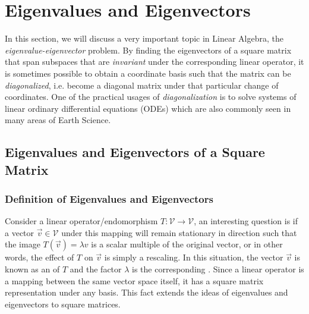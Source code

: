 \chapter{Eigenvalues and Eigenvectors}
\label{chap:eigen}

In this section, we will discuss a very important topic in Linear Algebra, the \textit{eigenvalue-eigenvector} problem. By finding the eigenvectors of a square matrix that span subspaces that are \textit{invariant} under the corresponding linear operator, it is sometimes possible to obtain a coordinate basis such that the matrix can be \textit{diagonalized}, i.e. become a diagonal matrix under that particular change of coordinates. One of the practical usages of \textit{diagonalization} is to solve systems of linear ordinary differential equations (ODEs) which are also commonly seen in many areas of Earth Science.

\section{Eigenvalues and Eigenvectors of a Square Matrix}
\label{section:eigensection}

\subsection{Definition of Eigenvalues and Eigenvectors}

Consider a linear operator/endomorphism $T: \mathcal{V} \to \mathcal{V}$, an interesting question is if a vector $\vec{v} \in \mathcal{V}$ under this mapping will remain stationary in direction such that the image $T(\vec{v}) = \lambda v$ is a scalar multiple of the original vector, or in other words, the effect of $T$ on $\vec{v}$ is simply a rescaling. In this situation, the vector $\vec{v}$ is known as an  of $T$ and the factor $\lambda$ is the corresponding . Since a linear operator is a mapping between the same vector space itself, it has a square matrix representation under any basis. This fact extends the ideas of eigenvalues and eigenvectors to square matrices.

